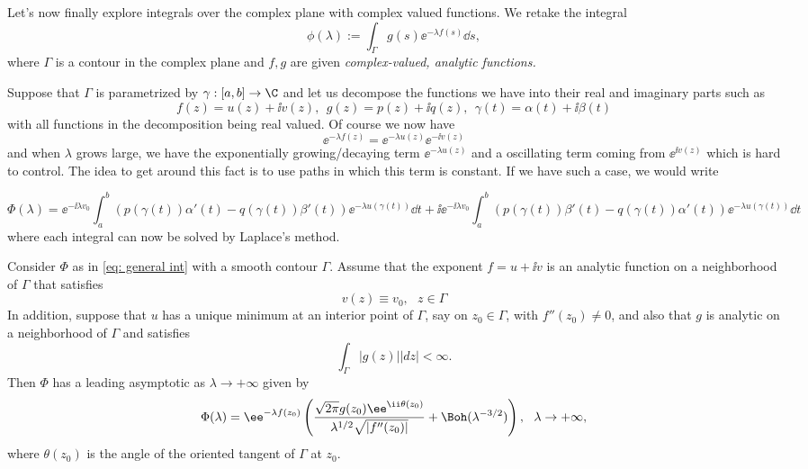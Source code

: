 Let's now finally explore integrals over the complex plane with complex valued functions. We retake the integral 
\begin{equation}
	\phi(\lambda) := \int_{\Gamma} g(s) \ee^{-\lambda f(s)} \dd s,
	\label{eq: general int}
\end{equation}
where $\Gamma$ is a contour in the complex plane and $f, g$ are given \textit{complex-valued, analytic functions.}

Suppose that $\Gamma$ is parametrized by $\gamma : [a,b] \rightarrow \C$ and let us decompose the functions we have into their real and imaginary parts such as
$$f(z) = u(z) + \ii v(z), \ \ g(z) = p(z) + \ii q(z), \ \ \gamma(t) = \alpha(t) + \ii \beta(t)$$
with all functions in the decomposition being real valued. Of course we now have 
$$\ee^{-\lambda f(z)} = \ee^{-\lambda u(z)} \ee^{-\ii v(z)}$$
and when $\lambda$ grows large, we have the exponentially growing/decaying term $\ee^{-\lambda u(z)}$ and a oscillating term coming from $\ee^{\ii v(z)}$ which is hard to control. The idea to get around this fact is to use paths in which this term is constant. If we have such a case, we would write

\begin{equation}
	\Phi(\lambda) = \ee^{-\ii \lambda v_0} \int_{a}^{b} (p(\gamma(t))\alpha'(t)-q(\gamma(t))\beta'(t)) \ee^{-\lambda u(\gamma(t))} \dd t + \ii \ee^{-\ii \lambda v_0} \int_{a}^{b} (p(\gamma(t))\beta'(t)-q(\gamma(t))\alpha'(t)) \ee^{-\lambda u(\gamma(t))} \dd t
	\label{eq: decomposition}
\end{equation}
where each integral can now be solved by Laplace's method.

\begin{thm}
	Consider $\Phi$ as in \ref{eq: general int} with a smooth contour $\Gamma$. Assume that the exponent $f = u + \ii v$ is an analytic function on a neighborhood of $\Gamma$ that satisfies
	$$v(z) \equiv v_0, \ \ \ z \in \Gamma$$
	In addition, suppose that $u$ has a unique minimum at an interior point of $\Gamma$, say on $z_0 \in \Gamma$, with $f''(z_0) \neq 0$, and also that $g$ is analytic on a neighborhood of $\Gamma$  and satisfies
	$$\int_{\Gamma} |g(z)| |dz| < \infty.$$
	Then $\Phi$ has a leading asymptotic as $\lambda \rightarrow +\infty$ given by
	$$\Phi(\lambda) = \ee^{-\lambda f(z_0)} \left(\frac{\sqrt{2\pi}g(z_0)\ee^{\ii \theta(z_0)}}{\lambda^{1/2}\sqrt{|f''(z_0)|}} + \Boh(\lambda^{-3/2}) \right), \ \ \lambda \rightarrow + \infty,$$
	where $\theta(z_0)$ is the angle of the oriented tangent of $\Gamma$ at $z_0$.
\end{thm}

